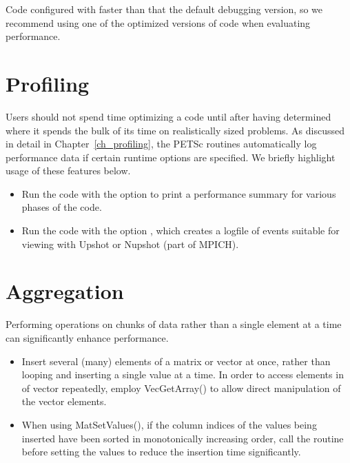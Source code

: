 {{Code configured with  
faster than that the default debugging version, so we recommend using one
of the optimized versions of code when evaluating performance.

\section{Profiling}
  

Users should not spend time optimizing a code until after having determined
where it spends the bulk of its time on realistically sized problems.
As discussed in detail in Chapter~\ref{ch_profiling}, the PETSc
routines automatically log performance data if certain runtime options
are specified.  We briefly highlight usage of these features below.

\begin{itemize}
\item Run the code with the option  to print a performance
   summary for various phases of the code. 

\item Run the code with the option  \trl{[logfilename]}, which creates a
   logfile of events suitable for viewing with Upshot or Nupshot (part of
   MPICH). 

\end{itemize}

\section{Aggregation}

Performing operations on chunks of data rather than a single element
at a time can significantly enhance performance.  
\begin{itemize}
\item Insert several (many) elements of a matrix or vector at once, rather 
   than looping and inserting a single value at a time.  In order to
   access elements in of vector repeatedly, employ {VecGetArray()} to allow 
   direct manipulation of the vector elements. 

\item When using MatSetValues(), if the column indices of the values being
   inserted have been sorted in monotonically increasing order, call
   the routine  before setting the values
   to reduce the insertion time significantly.


\end{itemize}}}
